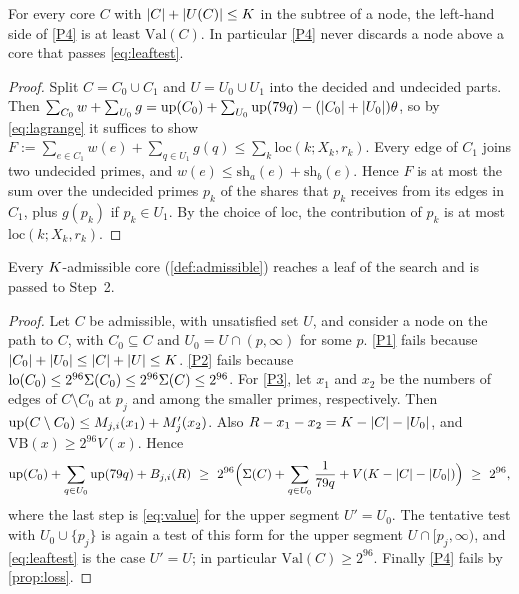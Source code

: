\documentclass[11pt]{article}
\begin{document}
\begin{proposition}\label{prop:loss}
For every core $C$ with $\lvert C\rvert+\lvert U(C)\rvert\le K$ in the subtree of a node, the left-hand side of \ref{P4} is at least $\mathrm{Val}(C)$. In particular \ref{P4} never discards a node above a core that passes \eqref{eq:leaftest}.
\end{proposition}

\begin{proof}
Split $C=C_0\cup C_1$ and $U=U_0\cup U_1$ into the decided and undecided parts. Then $\sum_{C_0}w+\sum_{U_0}g=\operatorname{up}(C_0)+\sum_{U_0}\operatorname{up}(79q)-(\lvert C_0\rvert+\lvert U_0\rvert)\theta$, so by \eqref{eq:lagrange} it suffices to show $F:=\sum_{e\in C_1}w(e)+\sum_{q\in U_1}g(q)\le\sum_k\mathrm{loc}(k;X_k,r_k)$.
Every edge of $C_1$ joins two undecided primes, and $w(e)\le\mathrm{sh}_a(e)+\mathrm{sh}_b(e)$. Hence $F$ is at most the sum over the undecided primes $p_k$ of the shares that $p_k$ receives from its edges in $C_1$, plus $g(p_k)$ if $p_k\in U_1$. By the choice of $\mathrm{loc}$, the contribution of $p_k$ is at most $\mathrm{loc}(k;X_k,r_k)$.
\end{proof}

\begin{lemma}\label{lem:step1}
Every $K$-admissible core (\cref{def:admissible}) reaches a leaf of the search and is passed to Step~2.
\end{lemma}

\begin{proof}
Let $C$ be admissible, with unsatisfied set $U$, and consider a node on the path to $C$, with $C_0\subseteq C$ and $U_0=U\cap(p,\infty)$ for some $p$.
\ref{P1} fails because $\lvert C_0\rvert+\lvert U_0\rvert\le\lvert C\rvert+\lvert U\rvert\le K$.
\ref{P2} fails because $\operatorname{lo}(C_0)\le2^{96}\Sigma(C_0)\le2^{96}\Sigma(C)\le2^{96}$.
For \ref{P3}, let $x_1$ and $x_2$ be the numbers of edges of $C\setminus C_0$ at $p_j$ and among the smaller primes, respectively. Then $\operatorname{up}(C\setminus C_0)\le M_{j,i}(x_1)+M'_j(x_2)$. Also $R-x_1-x_2=K-\lvert C\rvert-\lvert U_0\rvert$, and $\mathrm{VB}(x)\ge2^{96}V(x)$. Hence
\[
\up(C_0)+\sum_{q\in U_0}\up(79q)+B_{j,i}(R)\ \ge\ 2^{96}\Bigl(\Rec{C}+\sum_{q\in U_0}\frac1{79q}+V(\budget-\card{C}-\card{U_0})\Bigr)\ \ge\ 2^{96},
\]
where the last step is \eqref{eq:value} for the upper segment $U'=U_0$.
The tentative test with $U_0\cup\{p_j\}$ is again a test of this form for the upper segment $U\cap[p_j,\infty)$, and \eqref{eq:leaftest} is the case $U'=U$; in particular $\mathrm{Val}(C)\ge2^{96}$.
Finally \ref{P4} fails by \cref{prop:loss}.
\end{proof}
\end{document}

